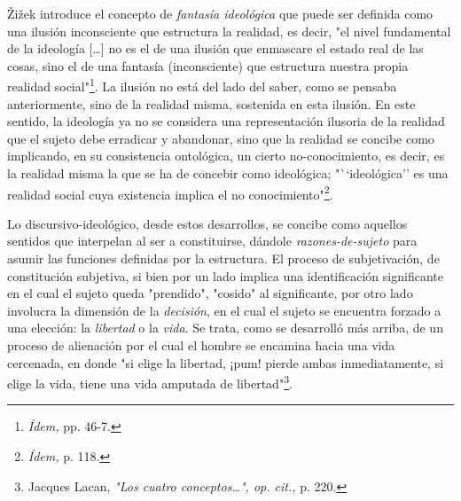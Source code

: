\documentclass{book}
\begin{document}
Žižek introduce el concepto de \emph{fantasía ideológica} que puede ser
definida como una ilusión inconsciente que estructura la realidad, es
decir, "el nivel fundamental de la ideología {[}\ldots{]} no es el de
una ilusión que enmascare el estado real de las cosas, sino el de una
fantasía (inconsciente) que estructura nuestra propia realidad
social"\footnote{\emph{Ídem,} pp. 46-7.}. La ilusión no está del lado
del saber, como se pensaba anteriormente, sino de la realidad misma,
sostenida en esta ilusión. En este sentido, la ideología ya no se
considera una representación ilusoria de la realidad que el sujeto debe
erradicar y abandonar, sino que la realidad se concibe como implicando,
en su consistencia ontológica, un cierto no-conocimiento, es decir, es
la realidad misma la que se ha de concebir como ideológica;
"``ideológica'' es una realidad social cuya existencia implica el no
conocimiento"\footnote{\emph{Ídem,} p. 118.}.

Lo discursivo-ideológico, desde estos desarrollos, se concibe como
aquellos sentidos que interpelan al ser a constituirse, dándole
\emph{razones-de-sujeto} para asumir las funciones definidas por la
estructura. El proceso de subjetivación, de constitución subjetiva, si
bien por un lado implica una identificación significante en el cual el
sujeto queda "prendido", "cosido" al significante, por otro lado
involucra la dimensión de la \emph{decisión}, en el cual el sujeto se
encuentra forzado a una elección: la \emph{libertad} o la \emph{vida}.
Se trata, como se desarrolló más arriba, de un proceso de alienación por
el cual el hombre se encamina hacia una vida cercenada, en donde "si
elige la libertad, ¡pum! pierde ambas inmediatamente, si elige la vida,
tiene una vida amputada de libertad"\footnote{Jacques Lacan, \emph{"Los
  cuatro conceptos\ldots", op. cit.,} p. 220.}.
\end{document}
